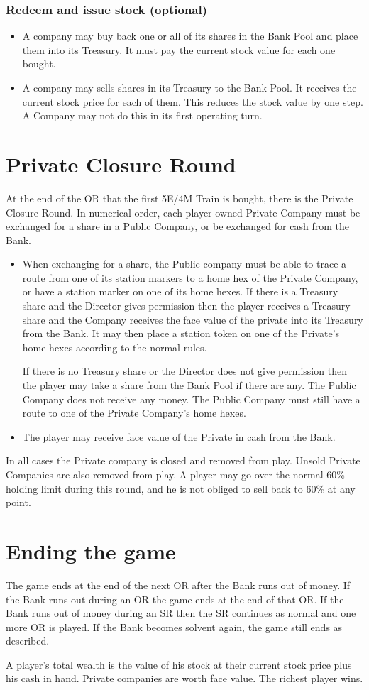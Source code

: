\documentclass[a4paper,twocolumn]{article}
\begin{document}
\subsubsection{Redeem and issue stock (optional)}
\begin{itemize}
	\item A company may buy back one or all of its shares in the Bank Pool and
	place them into its Treasury. It must pay the current stock value for each
	one bought.
	\item A company may sells shares in its Treasury to the Bank Pool. It
	receives the current stock price for each of them. This reduces the stock
	value by one step. A Company may not do this in its first operating turn.
\end{itemize}

\section{Private Closure Round}\label{sec:closure}
At the end of the OR that the first 5E/4M Train is bought, there is the Private
Closure Round. In numerical order, each player-owned Private Company must be
exchanged for a share in a Public Company, or be exchanged for cash from the
Bank.
\begin{itemize}
	\item When exchanging for a share, the Public company must be able to trace
	a route from one of its station markers to a home hex of the Private
	Company, or have a station marker on one of its home hexes. If there is a
	Treasury share and the Director gives permission then the player receives a
	Treasury share and the Company receives the face value of the private into
	its Treasury from the Bank. It may then place a station token on one of the
	Private's home hexes according to the normal rules.

	If there is no Treasury share or the Director does not give permission then
	the player may take a share from the Bank Pool if there are any. The Public
	Company does not receive any money. The Public Company must still have a
	route to one of the Private Company's home hexes.
	\item The player may receive face value of the Private in cash from the
	Bank.
\end{itemize}
In all cases the Private company is closed and removed from play. Unsold Private
Companies are also removed from play. A player may go over the normal 60\%
holding limit during this round, and he is not obliged to sell back to 60\% at
any point.

\section{Ending the game}
The game ends at the end of the next OR after the Bank runs out of money. If the
Bank runs out during an OR the game ends at the end of that OR. If the Bank runs
out of money during an SR then the SR continues as normal and one more OR is
played. If the Bank becomes solvent again, the game still ends as described.

A player's total wealth is the value of his stock at their current stock price
plus his cash in hand. Private companies are worth face value. The richest
player wins.
\end{document}
